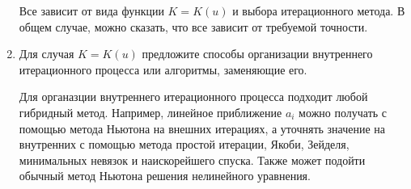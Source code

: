 \documentclass[12pt, a4paper]{article}
\begin{document}
\begin{enumerate}
Все зависит от вида функции $K = K(u)$ и выбора итерационного метода. В общем случае, можно сказать, что все зависит от требуемой точности.   


\item Для случая $K = K(u)$ предложите способы организации внутреннего итерационного процесса или алгоритмы, заменяющие его.

Для органазции внутреннего итерационного процесса подходит любой гибридный метод. Например, линейное приближение $a_i$ можно получать с помощью метода Ньютона на внешних итерациях, а уточнять значение на внутренних с помощью метода простой итерации, Якоби, Зейделя, минимальных невязок и наискорейшего спуска. Также может подойти обычный метод Ньютона решения нелинейного уравнения.  

\end{enumerate}


\newpage
\end{document}
